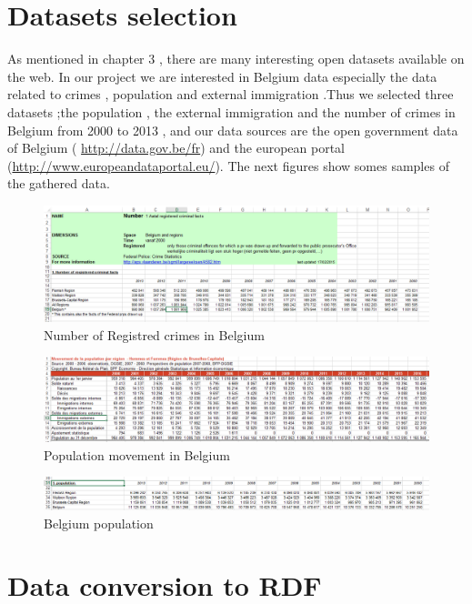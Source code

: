 \documentclass[a4paper,12pt,oneside]{report}
\begin{document}
{{\section {Datasets selection }
{As mentioned in chapter 3 , there are many interesting open datasets available on the web. In our project we are interested  in Belgium data especially  the data related to crimes , population and external immigration .Thus we selected three datasets ;the population , the external immigration and the number of crimes in Belgium from 2000 to 2013 , and our data sources are the open government data of Belgium ( \url {http://data.gov.be/fr})  and the european portal (\url {http://www.europeandataportal.eu/}).
The next figures show somes samples of the gathered data.
\begin{figure}[ht]
\centering
\includegraphics[width=1\textwidth]{cap1}
\caption{Number of Registred crimes in Belgium}
\end{figure}
\begin{figure}[ht]
\centering
\includegraphics[width=1\textwidth]{cap2}
\caption{Population movement in Belgium}
\end{figure}
\begin{figure}[ht]
\centering
\includegraphics[width=1\textwidth]{cap3}
\caption{ Belgium population}
\end{figure} }
\section { Data conversion to RDF }
}}
\end{document}
